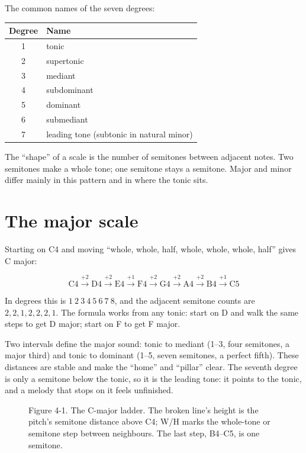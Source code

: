 The common names of the seven degrees:

\begin{center}
\small
\begin{tabular}{cl}
\toprule
Degree & Name \\
\midrule
1 & tonic \\
2 & supertonic \\
3 & mediant \\
4 & subdominant \\
5 & dominant \\
6 & submediant \\
7 & leading tone (subtonic in natural minor) \\
\bottomrule
\end{tabular}
\end{center}

The ``shape'' of a scale is the number of semitones between adjacent notes. Two semitones make a whole tone; one semitone stays a semitone. Major and minor differ mainly in this pattern and in where the tonic sits.

\section{The major scale}

Starting on C4 and moving ``whole, whole, half, whole, whole, whole, half'' gives C major:

\[
\mathrm{C4 \xrightarrow{+2} D4 \xrightarrow{+2} E4 \xrightarrow{+1} F4
\xrightarrow{+2} G4 \xrightarrow{+2} A4 \xrightarrow{+2} B4 \xrightarrow{+1} C5}
\]

In degrees this is \(1\ 2\ 3\ 4\ 5\ 6\ 7\ 8\), and the adjacent semitone counts are \(2,2,1,2,2,2,1\). The formula works from any tonic: start on D and walk the same steps to get D major; start on F to get F major.

Two intervals define the major sound: tonic to mediant (1--3, four semitones, a major third) and tonic to dominant (1--5, seven semitones, a perfect fifth). These distances are stable and make the ``home'' and ``pillar'' clear. The seventh degree is only a semitone below the tonic, so it is the leading tone: it points to the tonic, and a melody that stops on it feels unfinished.

\begin{figure}[htbp]
\centering
{}

\small Figure 4-1. The C-major ladder. The broken line's height is the pitch's semitone distance above C4; W/H marks the whole-tone or semitone step between neighbours. The last step, B4--C5, is one semitone.
\end{figure}

